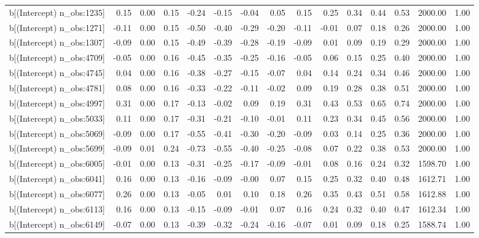 \begin{table}[ht]
\begin{tabular}{rrrrrrrrrrrrrrr}
  b[(Intercept) n\_obs:1235] & 0.15 & 0.00 & 0.15 & -0.24 & -0.15 & -0.04 & 0.05 & 0.15 & 0.25 & 0.34 & 0.44 & 0.53 & 2000.00 & 1.00 \\ 
  b[(Intercept) n\_obs:1271] & -0.11 & 0.00 & 0.15 & -0.50 & -0.40 & -0.29 & -0.20 & -0.11 & -0.01 & 0.07 & 0.18 & 0.26 & 2000.00 & 1.00 \\ 
  b[(Intercept) n\_obs:1307] & -0.09 & 0.00 & 0.15 & -0.49 & -0.39 & -0.28 & -0.19 & -0.09 & 0.01 & 0.09 & 0.19 & 0.29 & 2000.00 & 1.00 \\ 
  b[(Intercept) n\_obs:4709] & -0.05 & 0.00 & 0.16 & -0.45 & -0.35 & -0.25 & -0.16 & -0.05 & 0.06 & 0.15 & 0.25 & 0.40 & 2000.00 & 1.00 \\ 
  b[(Intercept) n\_obs:4745] & 0.04 & 0.00 & 0.16 & -0.38 & -0.27 & -0.15 & -0.07 & 0.04 & 0.14 & 0.24 & 0.34 & 0.46 & 2000.00 & 1.00 \\ 
  b[(Intercept) n\_obs:4781] & 0.08 & 0.00 & 0.16 & -0.33 & -0.22 & -0.11 & -0.02 & 0.09 & 0.19 & 0.28 & 0.38 & 0.51 & 2000.00 & 1.00 \\ 
  b[(Intercept) n\_obs:4997] & 0.31 & 0.00 & 0.17 & -0.13 & -0.02 & 0.09 & 0.19 & 0.31 & 0.43 & 0.53 & 0.65 & 0.74 & 2000.00 & 1.00 \\ 
  b[(Intercept) n\_obs:5033] & 0.11 & 0.00 & 0.17 & -0.31 & -0.21 & -0.10 & -0.01 & 0.11 & 0.23 & 0.34 & 0.45 & 0.56 & 2000.00 & 1.00 \\ 
  b[(Intercept) n\_obs:5069] & -0.09 & 0.00 & 0.17 & -0.55 & -0.41 & -0.30 & -0.20 & -0.09 & 0.03 & 0.14 & 0.25 & 0.36 & 2000.00 & 1.00 \\ 
  b[(Intercept) n\_obs:5699] & -0.09 & 0.01 & 0.24 & -0.73 & -0.55 & -0.40 & -0.25 & -0.08 & 0.07 & 0.22 & 0.38 & 0.53 & 2000.00 & 1.00 \\ 
  b[(Intercept) n\_obs:6005] & -0.01 & 0.00 & 0.13 & -0.31 & -0.25 & -0.17 & -0.09 & -0.01 & 0.08 & 0.16 & 0.24 & 0.32 & 1598.70 & 1.00 \\ 
  b[(Intercept) n\_obs:6041] & 0.16 & 0.00 & 0.13 & -0.16 & -0.09 & -0.00 & 0.07 & 0.15 & 0.25 & 0.32 & 0.40 & 0.48 & 1612.71 & 1.00 \\ 
  b[(Intercept) n\_obs:6077] & 0.26 & 0.00 & 0.13 & -0.05 & 0.01 & 0.10 & 0.18 & 0.26 & 0.35 & 0.43 & 0.51 & 0.58 & 1612.88 & 1.00 \\ 
  b[(Intercept) n\_obs:6113] & 0.16 & 0.00 & 0.13 & -0.15 & -0.09 & -0.01 & 0.07 & 0.16 & 0.24 & 0.32 & 0.40 & 0.47 & 1612.34 & 1.00 \\ 
  b[(Intercept) n\_obs:6149] & -0.07 & 0.00 & 0.13 & -0.39 & -0.32 & -0.24 & -0.16 & -0.07 & 0.01 & 0.09 & 0.18 & 0.25 & 1588.74 & 1.00 \\ 

\end{tabular}
\end{table}

